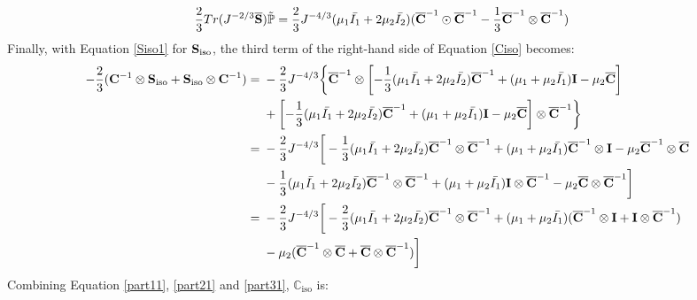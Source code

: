 \begin{equation} \label{part21}
\begin{split}
\frac{2}{3}Tr(J^{-2/3}\overline{\bold{S}})\tilde{\mathbb{P}}
&= \frac{2}{3}J^{-4/3}(\mu_1\bar{I_1} + 2\mu_2\bar{I_2})({\overline{\bold{C}}}^{-1} \odot {{\overline{\bold{C}}}}^{-1} - \frac{1}{3}{{\overline{\bold{C}}}}^{-1} \otimes {\overline{{\bold{C}}}}^{-1})
\end{split}
\end{equation}
Finally, with Equation \ref{Siso1} for $\bold{S}_\mathrm{iso}$, the third term of the right-hand side of Equation \ref{Ciso} becomes:
\begin{equation} \label{part31}
\begin{split}
- \frac{2}{3}(\bold{C}^{-1}\otimes\bold{S}_\mathrm{iso} + \bold{S}_\mathrm{iso}\otimes \bold{C}^{-1})
= {} &
- \frac{2}{3}J^{-4/3} \bigg\{ {\overline{\bold{C}}}^{-1} \otimes \left[-\frac{1}{3}(\mu_1\bar{I_1} + 2\mu_2\bar{I_2}){\overline{\bold{C}}}^{-1} + (\mu_1 + \mu_2\bar{I_1})\bold{I} - \mu_2{\overline{\bold{C}}} \right] \\
&+
\left[-\frac{1}{3}(\mu_1\bar{I_1} + 2\mu_2\bar{I_2}){\overline{\bold{C}}}^{-1} + (\mu_1 + \mu_2\bar{I_1})\bold{I} - \mu_2{\overline{\bold{C}}} \right] \otimes {\overline{\bold{C}}}^{-1} \bigg\} \\
= {} &
- \frac{2}{3}J^{-4/3} \bigg[ -\frac{1}{3}(\mu_1\bar{I_1} + 2\mu_2\bar{I_2}) {\overline{\bold{C}}}^{-1} \otimes {\overline{\bold{C}}}^{-1} + (\mu_1 + \mu_2\bar{I_1}){\overline{\bold{C}}}^{-1}\otimes\bold{I} - \mu_2{\overline{\bold{C}}}^{-1} \otimes {\overline{\bold{C}}} \\
&-
\frac{1}{3}(\mu_1\bar{I_1} + 2\mu_2\bar{I_2}) {\overline{\bold{C}}}^{-1} \otimes {\overline{\bold{C}}}^{-1} + (\mu_1 + \mu_2\bar{I_1})\bold{I} \otimes {\overline{\bold{C}}}^{-1} - \mu_2{\overline{\bold{C}}} \otimes {\overline{\bold{C}}}^{-1} \bigg] \\
= {} &
 - \frac{2}{3}J^{-4/3} \bigg[ -\frac{2}{3}(\mu_1\bar{I_1} + 2\mu_2\bar{I_2}){\overline{\bold{C}}}^{-1} \otimes {\overline{\bold{C}}}^{-1} + (\mu_1+\mu_2\bar{I_1})({\overline{\bold{C}}}^{-1} \otimes \bold{I} + \bold{I} \otimes {\overline{\bold{C}}}^{-1})\\
&- \mu_2({\overline{\bold{C}}}^{-1} \otimes {\overline{\bold{C}}}+{\overline{\bold{C}}} \otimes {\overline{\bold{C}}}^{-1}) \bigg]
\end{split}
\end{equation}
Combining Equation \ref{part11}, \ref{part21} and \ref{part31}, $\mathbb{C}_\mathrm{iso}$ is:
